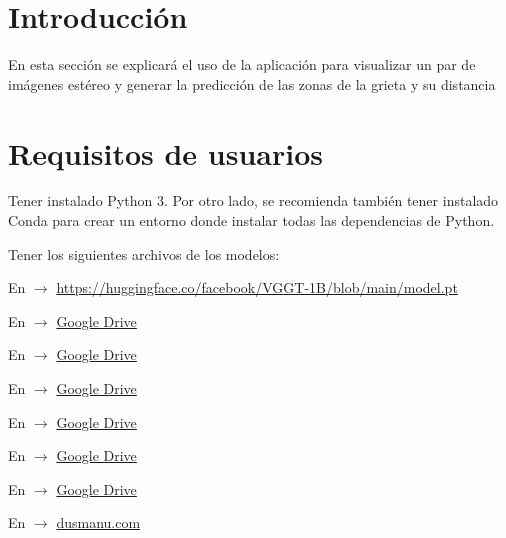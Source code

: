 
\section{Introducción}
En esta sección se explicará el uso de la aplicación para visualizar un par de imágenes estéreo y generar la predicción de las zonas de la grieta y su distancia

\section{Requisitos de usuarios}
Tener instalado Python 3. Por otro lado, se recomienda también tener instalado Conda para crear un entorno donde instalar todas las dependencias de Python.

Tener los siguientes archivos de los modelos:

En  $\rightarrow$
\url{https://huggingface.co/facebook/VGGT-1B/blob/main/model.pt}

En  $\rightarrow$
\href{https://drive.google.com/drive/folders/1cZLcIjHlmUo986gkR6FbofG1cj5BT36x}{Google Drive}

En  $\rightarrow$
\href{https://drive.google.com/drive/folders/1cZLcIjHlmUo986gkR6FbofG1cj5BT36x}{Google Drive}

En  $\rightarrow$
\href{https://drive.google.com/drive/folders/1cZLcIjHlmUo986gkR6FbofG1cj5BT36x}{Google Drive}

En  $\rightarrow$
\href{https://drive.google.com/drive/folders/1cZLcIjHlmUo986gkR6FbofG1cj5BT36x}{Google Drive}

En  $\rightarrow$
\href{https://drive.google.com/drive/folders/1cZLcIjHlmUo986gkR6FbofG1cj5BT36x}{Google Drive}

En  $\rightarrow$
\href{https://drive.google.com/drive/folders/1cZLcIjHlmUo986gkR6FbofG1cj5BT36x}{Google Drive}

En  $\rightarrow$
\href{https://dusmanu.com/files/d2-net/d2_tf.pth}{dusmanu.com}

